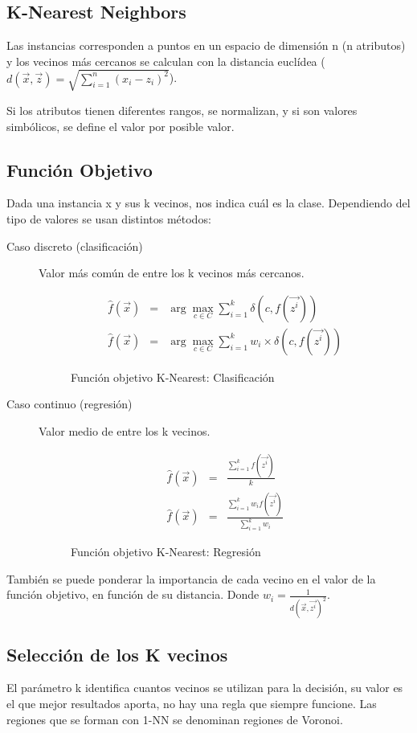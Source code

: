 \documentclass[12pt, twoside, openright]{report} %
\begin{document}
\subsection{K-Nearest Neighbors}
Las instancias corresponden a puntos en un espacio de dimensión n (n atributos) y los vecinos más cercanos se calculan con la distancia euclídea ($d\left( \vec{x},\vec{z}\right)   = \sqrt {\sum _{i=1}^{n}  \left( x_{i}-z_{i}\right)^2 }$).

Si los atributos tienen diferentes rangos, se normalizan, y si son valores simbólicos, se define el valor por posible valor.
\subsection{Función Objetivo}
Dada una instancia x y sus k vecinos, nos indica cuál es la clase. Dependiendo del tipo de valores se usan distintos métodos:
\begin{description}
  \item[Caso discreto (clasificación)] Valor más común de entre los k vecinos más cercanos.
  \begin{figure}[H]
    \begin{eqnarray}
      \hat{f}(\vec{x}) &=& \arg\max _{c \in C} \sum^k_{i=1} \delta(c,f(\vec{z^i})) \\
      \hat{f}(\vec{x}) &=& \arg\max _{c \in C} \sum^k_{i=1} w_i \times \delta(c,f(\vec{z^i}))
    \end{eqnarray}
    \captionsetup{justification=centering}
    \caption{Función objetivo K-Nearest: Clasificación}
  \end{figure} 
  \item[Caso continuo (regresión)] Valor medio de entre los k vecinos. 
  \begin{figure}[H]
    \begin{eqnarray}
      \hat{f}(\vec{x}) &=& \frac{\sum^k_{i=1} f(\vec{z^i})}{k}\\
      \hat{f}(\vec{x}) &=& \frac{\sum^k_{i=1} w_i f(\vec{z^i})}{\sum^k_{i=1} w_i}
    \end{eqnarray}
    \captionsetup{justification=centering}
    \caption{Función objetivo K-Nearest: Regresión}
  \end{figure}
\end{description}
También se puede ponderar la importancia de cada vecino en el valor de la función objetivo, en función de su distancia. Donde $w_i = \frac{1}{d(\vec{x},\vec{z^i})^2}$.

\subsection{Selección de los K vecinos}
El parámetro k identifica cuantos vecinos se utilizan para la decisión, su valor es el que mejor resultados aporta, no hay una regla que siempre funcione. Las regiones que se forman con 1-NN se denominan regiones de Voronoi.
\end{document}
